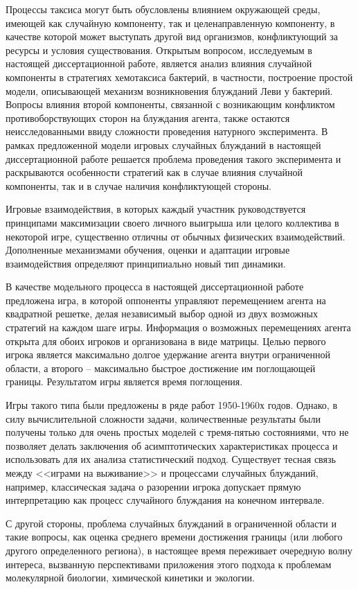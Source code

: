 Процессы таксиса могут быть обусловлены влиянием окружающей среды, имеющей как случайную компоненту, так и целенаправленную компоненту, в качестве которой может выступать другой вид организмов, конфликтующий за ресурсы и условия существования. Открытым вопросом, исследуемым в настоящей диссертационной работе, является анализ влияния случайной компоненты в стратегиях хемотаксиса бактерий, в частности, построение простой модели, описывающей механизм возникновения блужданий Леви у бактерий. Вопросы влияния второй компоненты, связанной с возникающим конфликтом противоборствующих сторон на блуждания агента, также остаются неисследованными ввиду сложности проведения натурного эксперимента. В рамках предложенной модели игровых случайных блужданий в настоящей диссертационной работе решается проблема проведения такого эксперимента и раскрываются особенности стратегий как в случае влияния случайной компоненты, так и в случае наличия конфликтующей стороны. 

Игровые взаимодействия, в которых каждый участник руководствуется принципами максимизации своего личного выигрыша или целого коллектива в некоторой игре, существенно отличны от обычных физических взаимодействий. Дополненные механизмами обучения, оценки и адаптации игровые взаимодействия определяют принципиально новый тип динамики.

В качестве модельного процесса в настоящей диссертационной работе предложена игра, в которой оппоненты управляют перемещением агента на квадратной решетке, делая независимый выбор одной из двух возможных стратегий на каждом шаге игры. Информация о возможных перемещениях агента открыта для обоих игроков и организована в виде матрицы. Целью первого игрока является максимально долгое удержание агента внутри ограниченной области, а второго -- максимально быстрое достижение им поглощающей границы. Результатом игры является время поглощения. 

Игры такого типа были предложены в ряде работ 1950-1960х годов. Однако, в силу вычислительной сложности задачи, количественные результаты были получены только для очень простых моделей с тремя-пятью состояниями, что не позволяет делать заключения об асимптотических характеристиках процесса и использовать для их анализа статистический подход. Существует тесная связь между <<играми на выживание>> и процессами случайных блужданий, например, классическая задача о разорении игрока допускает прямую интерпретацию как процесс случайного блуждания на конечном интервале. 

С другой стороны, проблема случайных блужданий в ограниченной области и такие вопросы, как оценка среднего времени достижения границы (или любого другого определенного региона), в настоящее время переживает очередную волну интереса, вызванную перспективами приложения этого подхода к проблемам молекулярной биологии, химической кинетики и экологии. 

